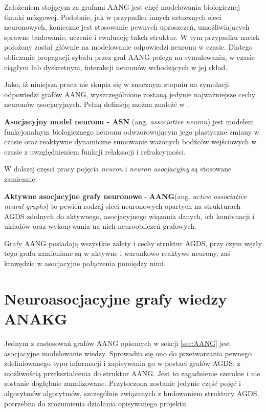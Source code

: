 Założeniem stojącym za grafami AANG jest chęć modelowania biologicznej tkanki mózgowej. Podobnie, jak w przypadku innych sztucznych sieci neuronowych,
konieczne jest stosowanie pewnych uproszczeń, umożliwiających sprawne budowanie, uczenie i ewaluację takch struktur. W tym przypadku nacisk położony
został głównie na modelowanie odpowiedzi neuronu w czasie. Dlatego obliczanie propagacji sybału przez graf AANG polega na symulowaniu, w czasie ciągłym
lub dyskretnym, interakcji neuronów wchodzących w jej skład.

Jako, iż niniejsza praca nie skupia się w znacznym stopniu na symulacji odpowiedzi grafów AANG, wyszczególnione zostaną jedynie najważniejsze cechy neuronów asocjacyjnych.
Pełną definicję można znaleźć w \cite{Horzyk}.

\begin{definicja}
    \textbf{Asocjacyjny model neuronu - ASN} (ang. \emph{associative neuron}) jest modelem funkcjonalnym biologicznego neuronu odwzorowującym jego plastyczne zmiany w czasie oraz
    reaktywne dynamiczne sumowanie ważonych bodźców wejściowych w czasie z uwzględnieniem funkcji relaksacji i refrakcyjności. 
\end{definicja}

W dalszej częsci pracy pojęcia \emph{neuron} i \emph{neuron asocjacyjny} są stosowane zamiennie.

\begin{definicja}
    \textbf{Aktywne asocjacyjne grafy neuronowe} - \textbf{AANG}(ang. \emph{active associative neural graphs}) to pewien rodzaj sieci neuronowych
    opartych na strukturach AGDS zdolnych do aktywnego, asocjacyjnego wiązania danych, ich kombinacji i układów oraz wykonywania na nich neuroobliczeń 
    grafowych. 
\end{definicja}

Grafy AANG posiadają wszystkie zalety i cechy struktur AGDS, przy czym węzły tego grafu zamieniane są w aktywne i warunkowo reaktywe neurony, zaś krawędzie w
 asocjacyjne połączenia pomiędzy nimi. 
 
\section{Neuroasocjacyjne grafy wiedzy ANAKG}
\label{sec:anakg}

Jednym z zastosowań grafów AANG opisanych w sekcji \ref{sec:AANG} jest asocjacyjne modelowanie wiedzy. Sprowadza się ono do przetwarzania pewnego zdefiniowanego typu informacji i 
zapisywania go w postaci grafów AGDS, z możliwością przekształcenia do struktur AANG. Jest to zagadnienie szerokie i nie zostanie dogłębnie zanalizowane. Przytoczona zostanie jedynie
 część pojęć i algorytmów algorytmów, szczególnie związanych z budowaniem struktury AGDS, potrzebna do zrozumienia działania opisywanego projektu.
 
